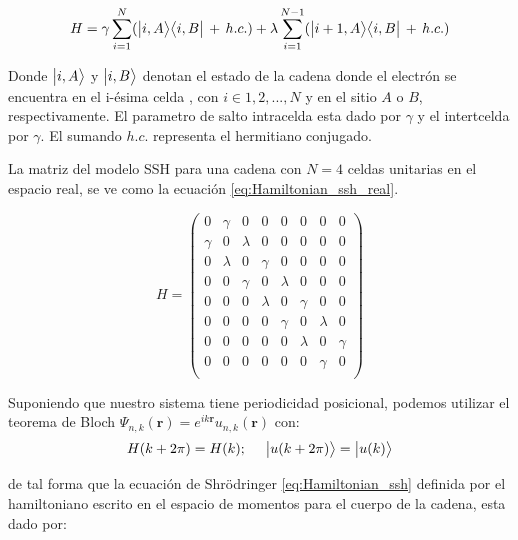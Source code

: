\begin{equation}
    \label{eq:Hamiltonian_ssh}
    H = \gamma \sum_{i=1}^N (\big |{i,A}\big \rangle\big \langle{i,B}\big | \,+\, h.c. ) + \lambda \sum_{i=1}^{N-1} (\big |{i + 1,A}\big \rangle\big \langle{i,B}\big | \,+\, h.c. ) 
\end{equation}

Donde $\big |{i,A}\big \rangle$ y $\big |{i,B}\big \rangle$ denotan el estado de la cadena donde el electrón se encuentra en el i-ésima celda , con $i \in {1,2,...,N}$ y en el sitio $A$ o $B$, respectivamente. El parametro de salto intracelda esta dado por $\gamma$ y el intertcelda por $\gamma$. El sumando $h.c.$ representa el hermitiano conjugado.

La matriz del modelo SSH para una cadena con $N = 4$ celdas unitarias en el espacio real, se ve como la ecuación \eqref{eq:Hamiltonian_ssh_real}.

\begin{equation}
    \label{eq:Hamiltonian_ssh_real}
    H = 
     \begin{pmatrix}
            0 & \gamma & 0 & 0 & 0 & 0 & 0 & 0 \\
            \gamma & 0 & \lambda & 0 & 0 & 0 & 0 & 0 \\
            0 & \lambda & 0 & \gamma & 0 & 0 & 0 & 0 \\
            0 & 0 & \gamma & 0 & \lambda & 0 & 0 & 0 \\
            0 & 0 & 0 & \lambda & 0 & \gamma & 0 & 0 \\
            0 & 0 & 0 & 0 & \gamma & 0 & \lambda & 0 \\
            0 & 0 & 0 & 0 & 0 & \lambda & 0 & \gamma \\
            0 & 0 & 0 & 0 & 0 & 0 & \gamma & 0 \\
            
        \end{pmatrix}
\end{equation}

Suponiendo que nuestro sistema tiene periodicidad posicional, podemos utilizar el teorema de Bloch $\Psi_{n,k}(\mathbf{r}) = e^{i k\mathbf{r}} u_{n,k}(\mathbf{r})$ con:
\begin{equation}
    H(k + 2\pi) = H(k) ; \,\,\,\,\,\,\,\, \big |{u(k + 2\pi)}\big \rangle = \big |{u(k)}\big \rangle 
\end{equation}


de tal forma que la ecuación de Shrödringer \eqref{eq:Hamiltonian_ssh} definida por el hamiltoniano escrito en el espacio de momentos para el cuerpo de la cadena, esta dado por:

